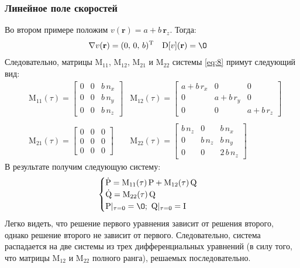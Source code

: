 \documentclass{article}
\newcommand{\bfv}[1]{\mathbf{#1}}
\newcommand{\dd}[1]{\dot{#1}}
\newcommand{\dv}[1]{\nabla v(#1)}
\newcommand{\ddv}[1]{\mathrm{D}[v](#1)}
\newcommand{\T}[1]{#1^\mathrm{T}}
\newcommand{\matr}[1]{\mathrm{#1}}
\begin{document}
\subsubsection{Линейное поле скоростей}
Во втором примере положим $v(\bfv{r}) = a + b\,\bfv{r}_z$. Тогда:
\begin{align*}
\dv{\bfv{r}} &= \T{(0,\,0,\,b)}  &   \ddv{\bfv{r}} &= \matr{\O}
\end{align*}
Следовательно, матрицы $\matr{M}_{11}$, $\matr{M}_{12}$, $\matr{M}_{21}$ и $\matr{M}_{22}$ системы \eqref{eq:8} примут следующий вид:
\begin{align*} 
&\matr{M}_{11}(\tau) = \begin{bmatrix}
0 & 0 & b\,n_x\\
0 & 0 & b\,n_y\\
0 & 0 & b\,n_z
\end{bmatrix}&\matr{M}_{12}(\tau) = \begin{bmatrix}
a + b\,r_x & 0 & 0\\
0 & a + b\,r_y & 0\\
0 & 0 & a + b\,r_z
\end{bmatrix}\\\\
&\matr{M}_{21}(\tau) = \begin{bmatrix}
0 & 0 & 0\\
0 & 0 & 0\\
0 & 0 & 0
\end{bmatrix}&\matr{M}_{22}(\tau) = \begin{bmatrix}
b\,n_z & 0 & b\,n_x\\
0 & b\,n_z & b\,n_y\\
0 & 0 & 2\,b\,n_z
\end{bmatrix}
\end{align*}
В результате получим следующую систему:
\begin{equation} \label{eq:11}
\begin{cases}
\dd{\matr{P}} = \matr{M}_{11}(\tau)\,\matr{P} + \matr{M}_{12}(\tau)\,\matr{Q}\\
\dd{\matr{Q}} = \matr{M}_{22}(\tau)\,\matr{Q}\\
\matr{P}|_{\tau=0} = \matr{\O}; \ \matr{Q}|_{\tau=0} = \matr{I}
\end{cases}
\end{equation}
Легко видеть, что решение первого уравнения зависит от решения второго, однако решение второго не зависит от первого. Следовательно, система распадается на две системы из трех дифференциальных уравнений (в силу того, что матрицы $\matr{M}_{12}$ и $\matr{M}_{22}$ полного ранга), решаемых последовательно.\\
\end{document}
